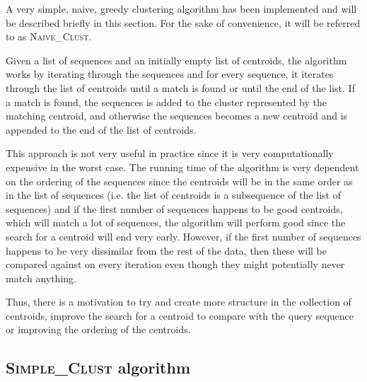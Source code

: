 A very simple, naive, greedy clustering algorithm has been implemented and will
be described briefly in this section. For the sake of convenience, it will be
referred to as \textsc{Naive\_Clust}.

Given a list of sequences and an initially empty list of centroids, the
algorithm works by iterating through the sequences and for every sequence, it
iterates through the list of centroids until a match is found or until the end
of the list. If a match is found, the sequences is added to the cluster
represented by the matching centroid, and otherwise the sequences becomes a new
centroid and is appended to the end of the list of centroids.



This approach is not very useful in practice since it is very computationally
expensive in the worst case. The running time of the algorithm is very
dependent on the ordering of the sequences since the centroids will be in the
same order as in the list of sequences (i.e. the list of centroids is a
subsequence of the list of sequences) and if the first number of sequences
happens to be good centroids, which will match a lot of sequences, the
algorithm will perform good since the search for a centroid will end very
early. However, if the first number of sequences happens to be very dissimilar
from the rest of the data, then these will be compared against on every
iteration even though they might potentially never match anything.

Thus, there is a motivation to try and create more structure in the collection
of centroids, improve the search for a centroid to compare with the query
sequence or improving the ordering of the centroids.




\subsection{\textsc{Simple\_Clust} algorithm}

